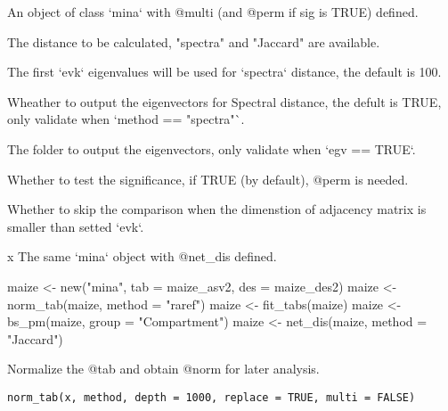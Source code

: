 \documentclass[a4paper]{book}
\begin{document}
\begin{Arguments}
\begin{ldescription}
\item[\code{x}] An object of class `mina` with @multi (and @perm if sig is TRUE)
defined.

\item[\code{method}] The distance to be calculated, "spectra" and "Jaccard" are
available.

\item[\code{evk}] The first `evk` eigenvalues will be used for `spectra` distance,
the default is 100.

\item[\code{egv}] Wheather to output the eigenvectors for Spectral distance, the
defult is TRUE, only validate when `method == "spectra"`.

\item[\code{dir}] The folder to output the eigenvectors, only validate when `egv ==
TRUE`.

\item[\code{sig}] Whether to test the significance, if TRUE (by default), @perm is
needed.

\item[\code{skip}] Whether to skip the comparison when the dimenstion of adjacency
matrix is smaller than setted `evk`.
\end{ldescription}
\end{Arguments}
%
\begin{Value}
x The same `mina` object with @net\_dis defined.
\end{Value}
%
\begin{Examples}
\begin{ExampleCode}
maize <- new("mina", tab = maize_asv2, des = maize_des2)
maize <- norm_tab(maize, method = "raref")
maize <- fit_tabs(maize)
maize <- bs_pm(maize, group = "Compartment")
maize <- net_dis(maize, method = "Jaccard")
\end{ExampleCode}
\end{Examples}
%
\begin{Description}\relax
Normalize the @tab and obtain @norm for later analysis.
\end{Description}
%
\begin{Usage}
\begin{verbatim}
norm_tab(x, method, depth = 1000, replace = TRUE, multi = FALSE)
\end{verbatim}
\end{Usage}
\end{document}
